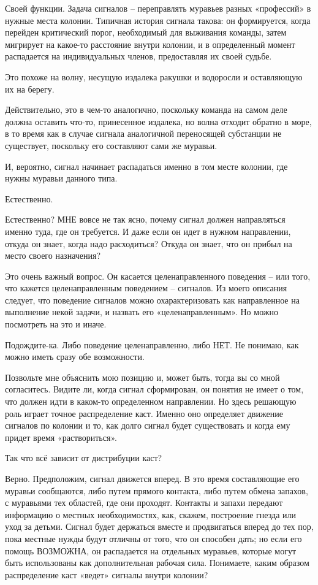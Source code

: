 \documentclass[../main.tex]{subfiles}
\begin{document}
\begin{dialogue}
 Своей функции. Задача сигналов \--- переправлять муравьев разных «профессий» в нужные места колонии. Типичная история сигнала такова: он формируется, когда перейден критический порог, необходимый для выживания команды, затем мигрирует на какое-то расстояние внутри колонии, и в определенный момент распадается на индивидуальных членов, предоставляя их своей судьбе.

 Это похоже на волну, несущую издалека ракушки и водоросли и оставляющую их на берегу.

 Действительно, это в чем-то аналогично, поскольку команда на самом деле должна оставить что-то, принесенное издалека, но волна отходит обратно в море, в то время как в случае сигнала аналогичной переносящей субстанции не существует, поскольку его составляют сами же муравьи.

 И, вероятно, сигнал начинает распадаться именно в том месте колонии, где нужны муравьи данного типа.

 Естественно.

 Естественно? МНЕ вовсе не так ясно, почему сигнал должен направляться именно туда, где он требуется. И даже если он идет в нужном направлении, откуда он знает, когда надо расходиться? Откуда он знает, что он прибыл на место своего назначения?

 Это очень важный вопрос. Он касается целенаправленного поведения \--- или того, что кажется целенаправленным поведением \--- сигналов. Из моего описания следует, что поведение сигналов можно охарактеризовать как направленное на выполнение некой задачи, и назвать его «целенаправленным». Но можно посмотреть на это и иначе.

 Подождите-ка. Либо поведение целенаправленно, либо НЕТ. Не понимаю, как можно иметь сразу обе возможности.

 Позвольте мне объяснить мою позицию и, может быть, тогда вы со мной согласитесь. Видите ли, когда сигнал сформирован, он понятия не имеет о том, что должен идти в каком-то определенном направлении. Но здесь решающую роль играет точное распределение каст. Именно оно определяет движение сигналов по колонии и то, как долго сигнал будет существовать и когда ему придет время «раствориться».

 Так что всё зависит от дистрибуции каст?

 Верно. Предположим, сигнал движется вперед. В это время составляющие его муравьи сообщаются, либо путем прямого контакта, либо путем обмена запахов, с муравьями тех областей, где они проходят. Контакты и запахи передают информацию о местных необходимостях, как, скажем, построение гнезда или уход за детьми. Сигнал будет держаться вместе и продвигаться вперед до тех пор, пока местные нужды будут отличны от того, что он способен дать; но если его помощь ВОЗМОЖНА, он распадается на отдельных муравьев, которые могут быть использованы как дополнительная рабочая сила. Понимаете, каким образом распределение каст «ведет» сигналы внутри колонии?


\end{dialogue}
\end{document}

